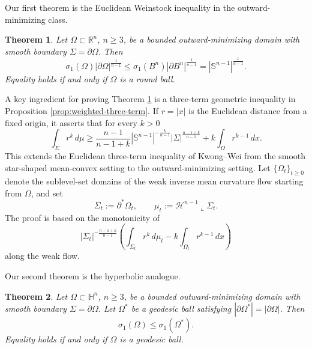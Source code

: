 \documentclass[11pt,reqno]{amsart}
\numberwithin{equation}{section}
\newtheorem{theorem}{Theorem}[section]
\theoremstyle{definition}
\newcommand{\R}{\mathbb R}
\newcommand{\Sn}{\mathbb S}
\newcommand{\HH}{\mathbb H}
\begin{document}
Our first theorem is the Euclidean Weinstock inequality in the outward-minimizing class.

\begin{theorem}\label{thm:weinstock}
Let $\Omega\subset\R^n$, $n\geq3$, be a bounded outward-minimizing domain with smooth  boundary $\Sigma=\partial\Omega$.  Then
\begin{equation}\label{eq:weinstock-main}
    \sigma_1(\Omega)|\partial\Omega|^{\frac1{n-1}}
    \leq
    \sigma_1(B^n)|\partial B^n|^{\frac1{n-1}}
    =|\Sn^{n-1}|^{\frac1{n-1}}.
\end{equation}
Equality holds if and only if $\Omega$ is a round ball.
\end{theorem}

A key ingredient for proving Theorem \ref{thm:weinstock} is a three-term geometric inequality in Proposition \ref{prop:weighted-three-term}.  If $r=|x|$ is the Euclidean distance from a fixed origin, it asserts that for every $k>0$
\begin{equation*}
    \int_\Sigma r^k\,d\mu
    \geq
    \frac{n-1}{n-1+k}|\Sn^{n-1}|^{-\frac{k}{n-1}}
    |\Sigma|^{\frac{n-1+k}{n-1}}
    + k\int_\Omega r^{k-1}\,dx.
\end{equation*}
This extends the Euclidean three-term inequality of Kwong--Wei \cite{KwongWei2023} from the smooth star-shaped mean-convex setting to the outward-minimizing setting. Let $\{\Omega_t\}_{t\geq0}$ denote the sublevel-set domains of the weak
inverse mean curvature flow starting from $\Omega$, and set
\[
    \Sigma_t:=\partial^*\Omega_t,
    \qquad
    \mu_t:=\mathcal H^{n-1}\mathbin{\llcorner}\Sigma_t.
\]
The proof is based on the monotonicity of
\begin{equation*}
    |\Sigma_t|^{-\frac{n-1+k}{n-1}}
    \left(\int_{\Sigma_t}r^k\,d\mu_t
        -k\int_{\Omega_t}r^{k-1}\,dx\right)
\end{equation*}
along the weak flow.

Our second theorem is the hyperbolic analogue.

\begin{theorem}\label{thm:hyp-outward-weinstock}
Let $\Omega\subset\HH^n$, $n\geq3$,  be a bounded outward-minimizing domain with smooth boundary $\Sigma=\partial\Omega$.  Let $\Omega^*$ be a geodesic ball satisfying $ |\partial\Omega^*|=|\partial\Omega|$.  Then
\begin{equation}\label{eq:hyp-weinstock-final}
    \sigma_1(\Omega)\leq\sigma_1(\Omega^*).
\end{equation}
Equality holds if and only if $\Omega$ is a geodesic ball.
\end{theorem}
\end{document}

